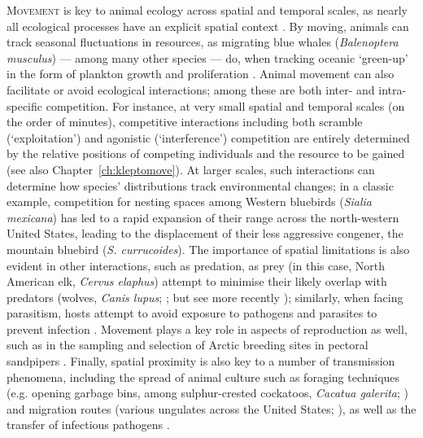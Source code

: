 \lettrine{M}{ovement} is key to animal ecology across spatial and temporal scales, as nearly all ecological processes have an explicit spatial context \citep{nathan2008a}.
By moving, animals can track seasonal fluctuations in resources, as migrating blue whales (\emph{Balenoptera musculus}) --- among many other species --- do, when tracking oceanic `green-up' in the form of plankton growth and proliferation \parencite{abrahms2021a,abrahms2019}.
Animal movement can also facilitate or avoid ecological interactions; among these are both inter- and intra-specific competition.
For instance, at very small spatial and temporal scales (on the order of minutes), competitive interactions including both scramble (`exploitation') and agonistic (`interference') competition \parencite[][]{keddy2001,birch1957} are entirely determined by the relative positions of competing individuals and the resource to be gained (see also Chapter~\ref{ch:kleptomove}).
At larger scales, such interactions can determine how species' distributions track environmental changes; in a classic example, competition for nesting spaces among Western bluebirds (\emph{Sialia mexicana}) has led to a rapid expansion of their range across the north-western United States, leading to the displacement of their less aggressive congener, the mountain bluebird (\emph{S. currucoides}).
The importance of spatial limitations is also evident in other interactions, such as predation, as prey (in this case, North American elk, \emph{Cervus elaphus}) attempt to minimise their likely overlap with predators (wolves, \emph{Canis lupus}; \cite{fortin2005}; but see more recently \cite{kohl2018}); similarly, when facing parasitism, hosts attempt to avoid exposure to pathogens and parasites to prevent infection \citep{weinstein2018}.
Movement plays a key role in aspects of reproduction as well, such as in the sampling and selection of Arctic breeding sites in pectoral sandpipers \parencite[\emph{Calidris melanotos};][]{kempenaers2017}.
Finally, spatial proximity is also key to a number of transmission phenomena, including the spread of animal culture such as foraging techniques (e.g. opening garbage bins, among sulphur-crested cockatoos, \emph{Cacatua galerita}; \cite{klump2021}) and migration routes (various ungulates across the United States; \cite{jesmer2018}), as well as the transfer of infectious pathogens \citep[][see also Chapter~\ref{ch:pathomove}]{weinstein2018,monk2022,stroeymeyt2018}.

